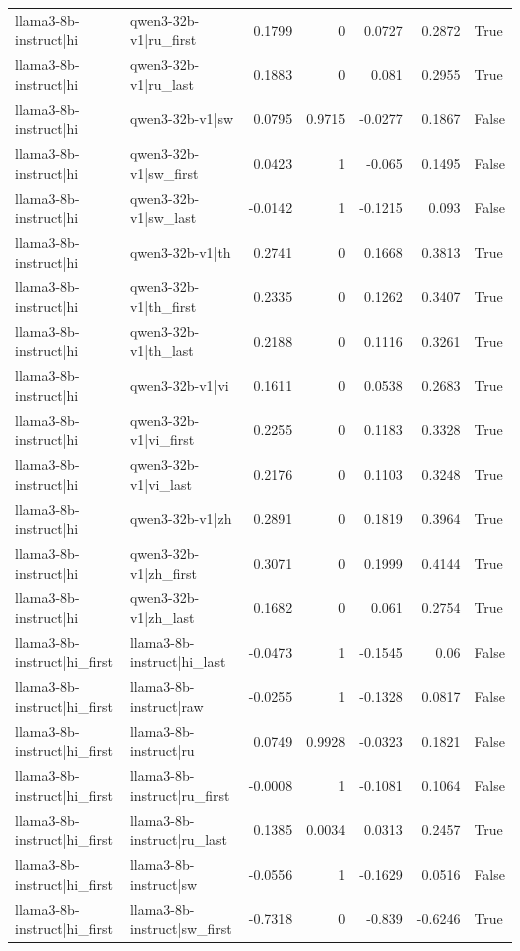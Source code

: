 \begin{table}
\begin{tabular}{l l r r r r l}
llama3-8b-instruct|hi & qwen3-32b-v1|ru_first & 0.1799 & 0 & 0.0727 & 0.2872 & True \\
llama3-8b-instruct|hi & qwen3-32b-v1|ru_last & 0.1883 & 0 & 0.081 & 0.2955 & True \\
llama3-8b-instruct|hi & qwen3-32b-v1|sw & 0.0795 & 0.9715 & -0.0277 & 0.1867 & False \\
llama3-8b-instruct|hi & qwen3-32b-v1|sw_first & 0.0423 & 1 & -0.065 & 0.1495 & False \\
llama3-8b-instruct|hi & qwen3-32b-v1|sw_last & -0.0142 & 1 & -0.1215 & 0.093 & False \\
llama3-8b-instruct|hi & qwen3-32b-v1|th & 0.2741 & 0 & 0.1668 & 0.3813 & True \\
llama3-8b-instruct|hi & qwen3-32b-v1|th_first & 0.2335 & 0 & 0.1262 & 0.3407 & True \\
llama3-8b-instruct|hi & qwen3-32b-v1|th_last & 0.2188 & 0 & 0.1116 & 0.3261 & True \\
llama3-8b-instruct|hi & qwen3-32b-v1|vi & 0.1611 & 0 & 0.0538 & 0.2683 & True \\
llama3-8b-instruct|hi & qwen3-32b-v1|vi_first & 0.2255 & 0 & 0.1183 & 0.3328 & True \\
llama3-8b-instruct|hi & qwen3-32b-v1|vi_last & 0.2176 & 0 & 0.1103 & 0.3248 & True \\
llama3-8b-instruct|hi & qwen3-32b-v1|zh & 0.2891 & 0 & 0.1819 & 0.3964 & True \\
llama3-8b-instruct|hi & qwen3-32b-v1|zh_first & 0.3071 & 0 & 0.1999 & 0.4144 & True \\
llama3-8b-instruct|hi & qwen3-32b-v1|zh_last & 0.1682 & 0 & 0.061 & 0.2754 & True \\
llama3-8b-instruct|hi_first & llama3-8b-instruct|hi_last & -0.0473 & 1 & -0.1545 & 0.06 & False \\
llama3-8b-instruct|hi_first & llama3-8b-instruct|raw & -0.0255 & 1 & -0.1328 & 0.0817 & False \\
llama3-8b-instruct|hi_first & llama3-8b-instruct|ru & 0.0749 & 0.9928 & -0.0323 & 0.1821 & False \\
llama3-8b-instruct|hi_first & llama3-8b-instruct|ru_first & -0.0008 & 1 & -0.1081 & 0.1064 & False \\
llama3-8b-instruct|hi_first & llama3-8b-instruct|ru_last & 0.1385 & 0.0034 & 0.0313 & 0.2457 & True \\
llama3-8b-instruct|hi_first & llama3-8b-instruct|sw & -0.0556 & 1 & -0.1629 & 0.0516 & False \\
llama3-8b-instruct|hi_first & llama3-8b-instruct|sw_first & -0.7318 & 0 & -0.839 & -0.6246 & True \\

\end{tabular}
\end{table}
